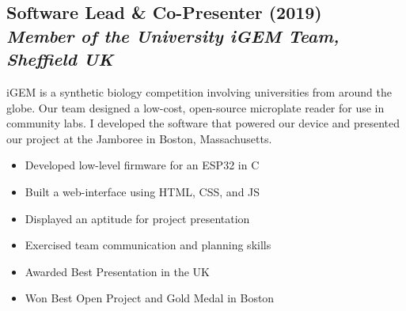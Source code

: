 \documentclass[twocolumn, a4paper, fontsize=9pt, headsepline, footsepline]{scrartcl}
\begin{document}
\subsection*{Software Lead \& Co-Presenter (2019)\\\textmd{\emph{Member of the
    University iGEM Team, Sheffield UK}}}
\noindent
iGEM is a synthetic biology competition involving universities from around the
globe. Our team designed a low-cost, open-source microplate reader for use in
community labs. I developed the software that powered our device and presented
our project at the Jamboree in Boston, Massachusetts.
\begin{itemize}
\item Developed low-level firmware for an ESP32 in C
\item Built a web-interface using HTML, CSS, and JS
\item Displayed an aptitude for project presentation
\item Exercised team communication and planning skills
\item Awarded Best Presentation in the UK
\item Won Best Open Project and Gold Medal in Boston
\end{itemize}

\end{document}
